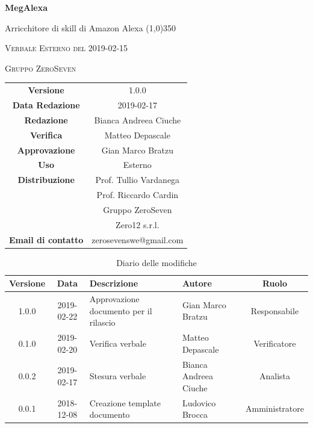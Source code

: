 \documentclass[a4paper,12pt]{article}
\author{Bianca Andreea Ciuche}
\date{2019-02-15}
\begin{document}
	\begin{titlepage}
		\centering
		{\huge\bfseries MegAlexa\par}
		Arricchitore di skill di Amazon Alexa
		\line(1,0){350} \\
		{\scshape\LARGE Verbale Esterno del 2019-02-15 \par}
		\vspace{1cm}
		{\scshape Gruppo ZeroSeven \par}
		\logo
		\begin{tabular}{c|c}
			{\hfill \textbf{Versione}} 			& 1.0.0\\
			{\hfill\textbf{Data Redazione}} 	& 2019-02-17\\ 
			{\hfill\textbf{Redazione}} 			&  Bianca Andreea Ciuche\\ 
			{\hfill\textbf{Verifica}} 				&  	Matteo Depascale\\ 
			{\hfill\textbf{Approvazione}} 		&  	Gian Marco Bratzu\\ 
			{\hfill\textbf{Uso}} 					& 	Esterno	\\ 
			{\hfill\textbf{Distribuzione}} 			& 			Prof. Tullio Vardanega \\ & Prof. Riccardo Cardin \\ & Gruppo ZeroSeven \\ & Zero12 s.r.l.	\\ 
			{\hfill\textbf{Email di contatto}} & zerosevenswe@gmail.com \\
		\end{tabular}
	\end{titlepage}
	
	
	
	\label{LastFrontPage}
	
	
	\newpage
	\cleardoublepage
	\begin{table}[tbph]
		\centering
		\begin{tabularx}{\textwidth}{|c|c|X|X|c|}
			\hline
			\textbf{Versione} & \textbf{Data} & \textbf{Descrizione} & \textbf{Autore} & \textbf{Ruolo} \\
			\hline
			1.0.0 & 2019-02-22 & Approvazione documento per il rilascio  & Gian Marco Bratzu & Responsabile \\
			\hline
			0.1.0 & 2019-02-20 & Verifica verbale & Matteo Depascale & Verificatore \\
			\hline
			0.0.2 & 2019-02-17 & Stesura verbale &Bianca Andreea Ciuche  & Analista \\
			\hline
			0.0.1 & 2018-12-08 & Creazione template documento & Ludovico Brocca & Amministratore\\
			\hline
		\end{tabularx}
		\caption{Diario delle modifiche}
	\end{table}
	\cleardoublepage
	\pagestyle{mymain}
	
\end{document}
